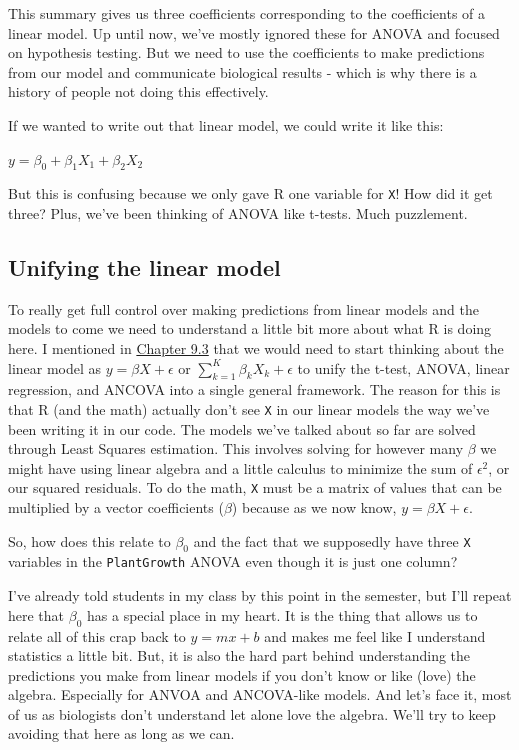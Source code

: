\documentclass[
]{book}
\begin{document}
This summary gives us three coefficients corresponding to the coefficients of a linear model. Up until now, we've mostly ignored these for ANOVA and focused on hypothesis testing. But we need to use the coefficients to make predictions from our model and communicate biological results - which is why there is a history of people not doing this effectively.

If we wanted to write out that linear model, we could write it like this:

\(y = \beta_0 + \beta_1 X_1 + \beta_2 X_2\)

But this is confusing because we only gave R one variable for \texttt{X}! How did it get three? Plus, we've been thinking of ANOVA like t-tests. Much puzzlement.

\hypertarget{unifying-the-linear-model}{%
\subsection{Unifying the linear model}\label{unifying-the-linear-model}}

To really get full control over making predictions from linear models and the models to come we need to understand a little bit more about what R is doing here. I mentioned in \protect\hyperlink{Chapter9}{Chapter 9.3} that we would need to start thinking about the linear model as \(y = \beta X + \epsilon\) or \(\sum_{k=1}^{K} \beta_k X_k + \epsilon\) to unify the t-test, ANOVA, linear regression, and ANCOVA into a single general framework. The reason for this is that R (and the math) actually don't see \texttt{X} in our linear models the way we've been writing it in our code. The models we've talked about so far are solved through Least Squares estimation. This involves solving for however many \(\beta\) we might have using linear algebra and a little calculus to minimize the sum of \(\epsilon^2\), or our squared residuals. To do the math, \texttt{X} must be a matrix of values that can be multiplied by a vector coefficients (\(\beta\)) because as we now know, \(y = \beta X + \epsilon\).

So, how does this relate to \(\beta_0\) and the fact that we supposedly have three \texttt{X} variables in the \texttt{PlantGrowth} ANOVA even though it is just one column?

I've already told students in my class by this point in the semester, but I'll repeat here that \(\beta_0\) has a special place in my heart. It is the thing that allows us to relate all of this crap back to \(y = mx + b\) and makes me feel like I understand statistics a little bit. But, it is also the hard part behind understanding the predictions you make from linear models if you don't know or like (love) the algebra. Especially for ANVOA and ANCOVA-like models. And let's face it, most of us as biologists don't understand let alone love the algebra. We'll try to keep avoiding that here as long as we can.
\end{document}
